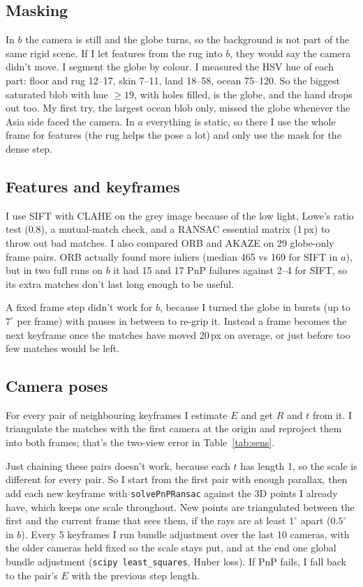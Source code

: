 \documentclass[conference]{assets/latex/IEEEtran}
\begin{document}
\subsection{Masking}
In $b$ the camera is still and the globe turns, so the background is not part
of the same rigid scene. If I let features from the rug into $b$, they would
say the camera didn't move. I segment the globe by colour. I measured the HSV
hue of each part: floor and rug 12--17, skin 7--11, land 18--58, ocean
75--120. So the biggest saturated blob with hue $\ge 19$, with holes filled,
is the globe, and the hand drops out too. My first try, the largest ocean
blob only, missed the globe whenever the Asia side faced the camera. In $a$
everything is static, so there I use the whole frame for features (the rug
helps the pose a lot) and only use the mask for the dense step.

\subsection{Features and keyframes}
I use SIFT with CLAHE on the grey image because of the low light, Lowe's
ratio test (0.8), a mutual-match check, and a RANSAC essential matrix (1\,px)
to throw out bad matches. I also compared ORB and AKAZE on 29 globe-only
frame pairs. ORB actually found more inliers (median 465 vs 169 for SIFT in
$a$), but in two full runs on $b$ it had 15 and 17 PnP failures against 2--4
for SIFT, so its extra matches don't last long enough to be useful.

A fixed frame step didn't work for $b$, because I turned the globe in bursts
(up to $7^\circ$ per frame) with pauses in between to re-grip it. Instead a
frame becomes the next keyframe once the matches have moved 20\,px on
average, or just before too few matches would be left.

\subsection{Camera poses}
For every pair of neighbouring keyframes I estimate $E$ and get $R$ and $t$
from it. I triangulate the matches with the first camera at the origin and
reproject them into both frames; that's the two-view error in
Table~\ref{tab:sens}.

Just chaining these pairs doesn't work, because each $t$ has length 1, so the
scale is different for every pair. So I start from the first pair with enough
parallax, then add each new keyframe with \texttt{solvePnPRansac} against the
3D points I already have, which keeps one scale throughout. New points are
triangulated between the first and the current frame that sees them, if the
rays are at least $1^\circ$ apart ($0.5^\circ$ in $b$). Every 5 keyframes I run
bundle adjustment over the last 10 cameras, with the older cameras held fixed
so the scale stays put, and at the end one global bundle adjustment
(\texttt{scipy least\_squares}, Huber loss). If PnP fails, I fall back to the
pair's $E$ with the previous step length.
\end{document}
